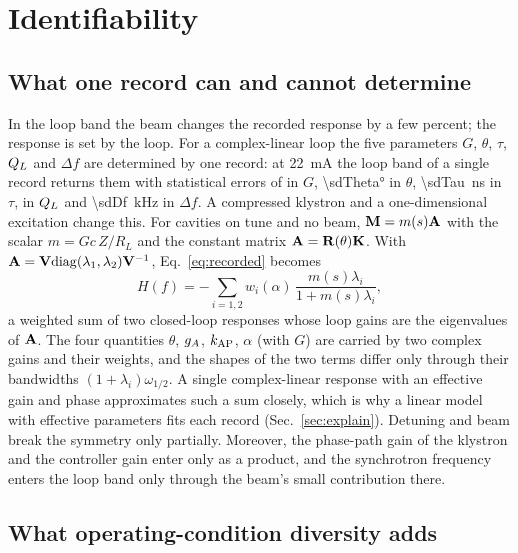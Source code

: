 \section{Identifiability}\label{sec:ident}

\subsection{What one record can and cannot determine}

In the loop band the beam changes the recorded response by a few percent; the response is set by the loop. For a complex-linear loop the five parameters $G$, $\theta$, $\tau$, $Q_L$ and $\Delta f$ are determined by one record: at \SI{22}{mA} the loop band of a single record returns them with statistical errors of \sdG{} in $G$, \ang{\sdTheta} in $\theta$, \SI{\sdTau}{ns} in $\tau$, \sdQL{} in $Q_L$ and \SI{\sdDf}{kHz} in $\Delta f$. A compressed klystron and a one-dimensional excitation change this. For cavities on tune and no beam, $\mathbf{M}=m(s)\mathbf{A}$ with the scalar $m=Gc\,Z/R_L$ and the constant matrix $\mathbf{A}=\mathbf{R}(\theta)\mathbf{K}$. With $\mathbf{A}=\mathbf{V}\mathrm{diag}(\lambda_1,\lambda_2)\mathbf{V}^{-1}$, Eq.~\eqref{eq:recorded} becomes
\begin{equation}\label{eq:twomodes}
H(f)=-\sum_{i=1,2}w_i(\alpha)\,\frac{m(s)\lambda_i}{1+m(s)\lambda_i},
\end{equation}
a weighted sum of two closed-loop responses whose loop gains are the eigenvalues of $\mathbf{A}$. The four quantities $\theta$, $g_A$, $k_\mathrm{AP}$, $\alpha$ (with $G$) are carried by two complex gains and their weights, and the shapes of the two terms differ only through their bandwidths $(1+\lambda_i)\omega_{1/2}$. A single complex-linear response with an effective gain and phase approximates such a sum closely, which is why a linear model with effective parameters fits each record (Sec.~\ref{sec:explain}). Detuning and beam break the symmetry only partially. Moreover, the phase-path gain of the klystron and the controller gain enter only as a product, and the synchrotron frequency enters the loop band only through the beam's small contribution there.

\subsection{What operating-condition diversity adds}

